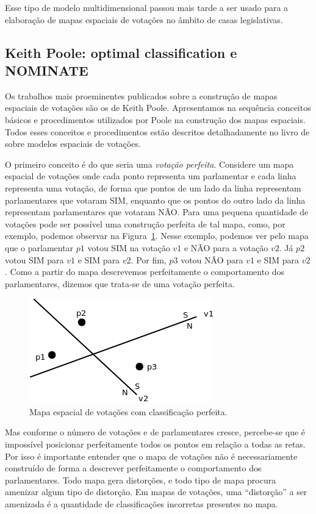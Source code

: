 \documentclass[
	article,			%
	12pt,				%
    twoside,			%
	a4paper,			%
	english,			%
	french,				%
	spanish,			%
	brazil,				%
	]{abntex2}
\newcommand\nay{NÃO\xspace}
\newcommand\yea{SIM\xspace}
\newcommand\nominate{NOMINATE\xspace}
\begin{document}
Esse tipo de modelo multidimensional passou mais tarde a ser usado para a elaboração de mapas espaciais de votações no âmbito de casas legislativas.

\subsection{Keith Poole: optimal classification e \nominate}

Os trabalhos mais proeminentes publicados sobre a construção de mapas espaciais de votações são os de Keith Poole. Apresentamos na sequência conceitos básicos e procedimentos utilizados por Poole na construção dos mapas espaciais. Todos esses conceitos e procedimentos estão descritos detalhadamente no livro de  sobre modelos espaciais de votações.

O primeiro conceito é do que seria uma \emph{votação perfeita}. Considere um mapa espacial de votações onde cada ponto representa um parlamentar e cada linha representa uma votação, de forma que pontos de um lado da linha representam parlamentares que votaram \yea, enquanto que os pontos do outro lado da linha representam parlamentares que votaram \nay. Para uma pequena quantidade de votações pode ser possível uma construção perfeita de tal mapa, como, por exemplo, podemos observar na Figura~\ref{fig:mapa-classificacao-perfeita}.
Nesse exemplo, podemos ver pelo mapa que o parlamentar $p1$ votou \yea na votação $v1$ e \nay para a votação $v2$. Já $p2$ votou \yea para $v1$ e \yea para $v2$. Por fim, $p3$ votou \nay para $v1$ e \yea para $v2$. Como a partir do mapa descrevemos perfeitamente o comportamento dos parlamentares, dizemos que trata-se de uma votação perfeita.

\begin{figure}[h]
  \centering
  \includegraphics[scale=0.6]{figs/votacao-perfeita.png}
  \caption{Mapa espacial de votações com classificação perfeita.}
  \label{fig:mapa-classificacao-perfeita}
\end{figure}

Mas conforme o número de votações e de parlamentares cresce, percebe-se que é impossível posicionar perfeitamente todos os pontos em relação a todas as retas. Por isso é importante entender que o mapa de votações não é necessariamente construído de forma a descrever perfeitamente o comportamento dos parlamentares. Todo mapa gera distorções, e todo tipo de mapa procura amenizar algum tipo de distorção. Em mapas de votações, uma ``distorção'' a ser amenizada é a quantidade de classificações incorretas presentes no mapa.
\end{document}
